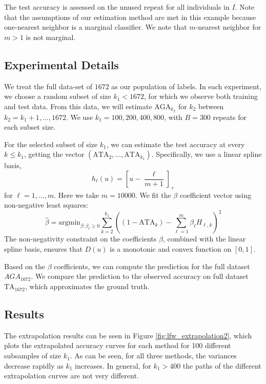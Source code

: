 \documentclass[twoside,11pt]{article}
\newcommand{\argmin}{\text{argmin}}
\begin{document}
The test accuracy is assessed on the unused repeat for all individuals
in $I$.  Note that the assumptions of our estimation method are met in
this example because one-nearest neighbor is a marginal classifier.
We note that $m$-nearest neighbor for $m > 1$ is not marginal.

\subsection{Experimental Details}\label{sec:exp_details}
We treat the full data-set of $1672$ as our population of labels. In
each experiment, we choose a random subset of size $k_1<1672$, for
which we observe both training and test data. From this data, we will
estimate $\text{AGA}_{k_2}$ for $k_2$ between $k_2 =
k_1+1,...,1672$. We use $k_1 = 100,200,400,800$, with $B = 300$
repeats for each subset size.

For the selected subset of size $k_1$, we can estimate the test
accuracy at every $k \leq k_1$, getting the vector
$(\text{ATA}_2,...,\text{ATA}_{k_1})$.  Specifically, we use a linear
spline basis,
\[
h_\ell(u) = \left[u - \frac{\ell}{m + 1}\right]_+
\]
for $\ell = 1,\hdots, m$.  Here we take $m = 10000$. 
We fit the $\beta$ coefficient vector using non-negative least squares: 
\[
\hat{\beta} = \argmin_{\beta: \beta_\ell \geq 0} \sum_{k=2}^{k_1} \left( (1 - \text{ATA}_k) - \sum_{\ell=1}^m \beta_\ell H_{\ell, k}\right)^2
\]
The non-negativity constraint on the coefficients $\beta$, combined
with the linear spline basis, ensures that ${D}(u)$ is a monotonic
and convex function on $[0,1]$.

Based on the $\beta$ coefficients, we can compute the prediction for
the full dataset $\hat{AGA}_{1672}$.  We compare the prediction to the
observed accuracy on full dataset $\text{TA}_{1672}$, which
approximates the ground truth.

\subsection{Results}

The extrapolation results can be seen in Figure
\ref{fig:lfw_extrapolation2}, which plots the extrapolated accuracy
curves for each method for 100 different subsamples of size $k_1$.  As
can be seen, for all three methods, the variances decrease rapidly as
$k_1$ increases. In general, for $k_1>400$ the paths of the different
extrapolation curves are not very different. 
\end{document}
